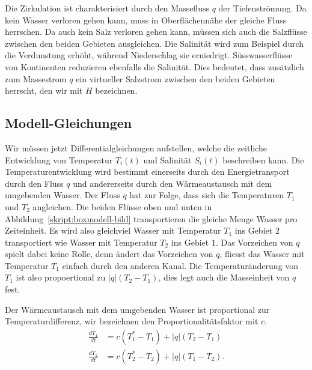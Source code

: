 Die Zirkulation ist charakterisiert durch den Massefluss $q$ der
Tiefenströmung.
Da kein Wasser verloren gehen kann, muss in Oberflächennähe der gleiche
Fluss herrschen.
Da auch kein Salz verloren gehen kann, müssen sich auch die Salzflüsse
zwischen den beiden Gebieten ausgleichen.
Die Salinität wird zum Beispiel durch die Verdunstung erhöht, während
Niederschlag sie erniedrigt.
Süsswasserflüsse von Kontinenten reduzieren ebenfalls die Salinität.
Dies bedeutet, dass zusätzlich zum Massestrom $q$ ein virtueller 
Salzstrom zwischen den beiden Gebieten herrscht, den wir mit $H$ bezeichnen.

\subsection{Modell-Gleichungen\label{skript:thc:modell-gleichungen}}
Wir müssen jetzt Differentialgleichungen aufstellen, welche die
zeitliche Entwicklung von Temperatur $T_i(t)$ und Salinität $S_i(t)$
beschreiben kann.
Die Temperaturentwicklung wird bestimmt einerseits durch den Energietransport
durch den Fluss $q$ und andererseits durch den Wärmeaustausch mit dem
umgebenden Wasser.
Der Fluss $q$ hat zur Folge, dass sich die Temperaturen $T_1$ und $T_2$
angleichen.
Die beiden Flüsse oben und unten in Abbildung~\ref{skript:boxmodell-bild}
transportieren die gleiche Menge Wasser pro Zeiteinheit.
Es wird also gleichviel Wasser mit Temperatur $T_1$ ins Gebiet $2$ 
transportiert wie Wasser mit Temperatur $T_2$ ins Gebiet $1$.
Das Vorzeichen von $q$ spielt dabei keine Rolle, denn ändert das
Vorzeichen von $q$, fliesst das Wasser mit Temperatur $T_1$ einfach
durch den anderen Kanal.
Die Temperaturänderung von $T_1$ ist also propoertional zu $|q|(T_2-T_1)$,
dies legt auch die Masseinheit von $q$ fest.

Der Wärmeaustausch mit dem umgebenden Wasser ist proportional zur
Temperaturdifferenz, wir bezeichnen den Proportionalitätsfaktor mit $c$.
\begin{equation}
\begin{aligned}
\frac{dT_1}{dt}
&=
c(T_1^*-T_1)
+
|q|(T_2-T_1)
\\
\frac{dT_2}{dt}
&=
c(T_2^*-T_2)
+
|q|(T_1-T_2).
\end{aligned}
\label{skript:thc:temperaturgleichung}
\end{equation}

